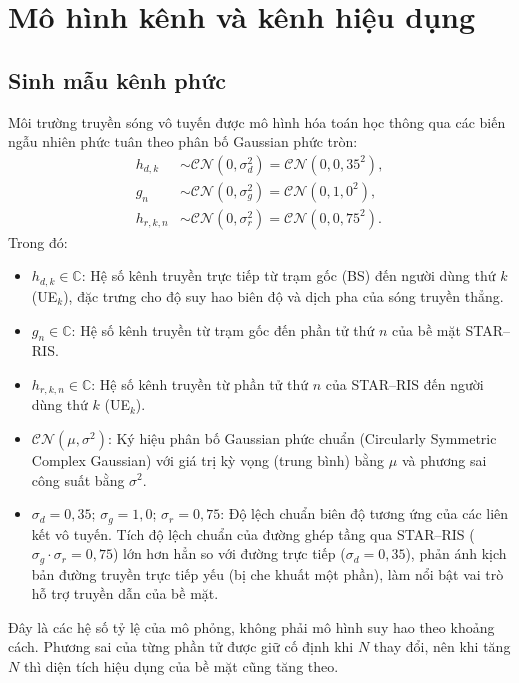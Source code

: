 \section{Mô hình kênh và kênh hiệu dụng}
\label{sec:mo-hinh-kenh}

\subsection{Sinh mẫu kênh phức}
\label{ssec:sinh-mau-kenh}

Môi trường truyền sóng vô tuyến được mô hình hóa toán học thông qua các biến ngẫu nhiên phức tuân theo phân
bố Gaussian phức tròn:
\begin{align}
h_{d,k} &\sim \mathcal{CN}(0, \sigma_d^2) = \mathcal{CN}(0, 0,35^2), \label{eq:kenh-truc-tiep}\\
g_n &\sim \mathcal{CN}(0, \sigma_g^2) = \mathcal{CN}(0, 1,0^2), \label{eq:kenh-bs-ris}\\
h_{r,k,n} &\sim \mathcal{CN}(0, \sigma_r^2) = \mathcal{CN}(0, 0,75^2). \label{eq:kenh-ris-ue}
\end{align}
Trong đó:
\begin{itemize}
\item $h_{d,k} \in \mathbb{C}$: Hệ số kênh truyền trực tiếp từ trạm gốc (BS) đến người dùng thứ $k$
  (UE$_k$), đặc trưng cho độ suy hao biên độ và dịch pha của sóng truyền thẳng.
\item $g_n \in \mathbb{C}$: Hệ số kênh truyền từ trạm gốc đến phần tử thứ $n$ của bề mặt STAR--RIS.
\item $h_{r,k,n} \in \mathbb{C}$: Hệ số kênh truyền từ phần tử thứ $n$ của STAR--RIS đến người dùng thứ $k$
  (UE$_k$).
\item $\mathcal{CN}(\mu, \sigma^2)$: Ký hiệu phân bố Gaussian phức chuẩn (Circularly Symmetric Complex
  Gaussian) với giá trị kỳ vọng (trung bình) bằng $\mu$ và phương sai công suất bằng $\sigma^2$.
\item $\sigma_d = 0,35$; $\sigma_g = 1,0$; $\sigma_r = 0,75$: Độ lệch chuẩn biên độ tương ứng của các liên
  kết vô tuyến. Tích độ lệch chuẩn của đường ghép tầng qua STAR--RIS ($\sigma_g \cdot \sigma_r = 0,75$) lớn
  hơn hẳn so với đường trực tiếp ($\sigma_d = 0,35$), phản ánh kịch bản đường truyền trực tiếp yếu (bị che
  khuất một phần), làm nổi bật vai trò hỗ trợ truyền dẫn của bề mặt.
\end{itemize}
Đây là các hệ số tỷ lệ của mô phỏng, không phải mô hình suy hao theo khoảng cách. Phương sai của từng phần
tử được giữ cố định khi $N$ thay đổi, nên khi tăng $N$ thì diện tích hiệu dụng của bề mặt cũng tăng theo.

